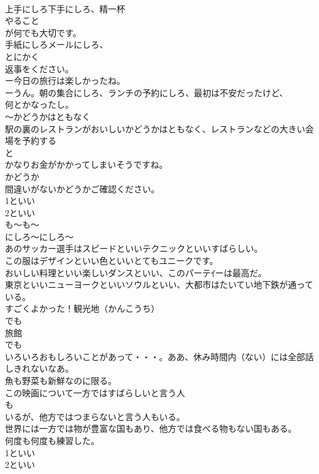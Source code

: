 \documentclass[8pt]{extreport}
\begin{document}
\begin{CJK}{UTF8}{min}
\\	上手にしろ下手にしろ、精一杯
\\	やること
\\	が何でも大切です。
\\	手紙にしろメールにしろ、
\\	とにかく
\\	返事をください。
\\	ー今日の旅行は楽しかったね。
\\	ーうん。朝の集合にしろ、ランチの予約にしろ、最初は不安だったけど、
\\	何とかなったし。
\\	～かどうかはともなく
\\	駅の裏のレストランがおいしいかどうかはともなく、レストランなどの大きい会場を予約する
\\	と
\\	かなりお金がかかってしまいそうですね。
\\	かどうか
\\	間違いがないかどうかご確認ください。
\\	1といい
\\	2といい
\\	も～も～ 
\\	にしろ～にしろ～ 
\\	あのサッカー選手はスピードといいテクニックといいすばらしい。
\\	この服はデザインといい色といいとてもユニークです。
\\	おいしい料理といい楽しいダンスといい、このパーテｲーは最高だ。
\\	東京といいニューヨークといいソウルといい、大都市はたいてい地下鉄が通っている。
\\	すごくよかった！観光地（かんこうち）
\\	でも
\\	旅館
\\	でも
\\	いろいろおもしろいことがあって・・・。ああ、休み時間内（ない）には全部話しきれないなあ。
\\	魚も野菜も新鮮なのに限る。
\\	この映画について一方ではすばらしいと言う人
\\	も
\\	いるが、他方ではつまらないと言う人もいる。
\\	世界には一方では物が豊富な国もあり、他方では食べる物もない国もある。
\\	何度も何度も練習した。	
\\	1といい
\\	2といい

\end{CJK}
\end{document}
